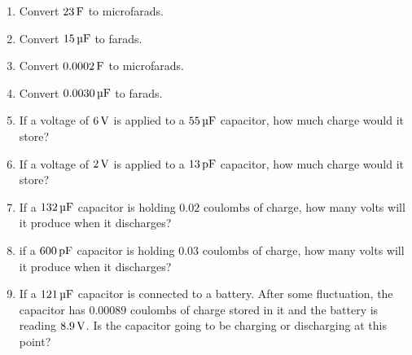 \exercisesection

\begin{enumerate}
\item Convert $23\,\si{\farad}$ to microfarads.
\item Convert $15\,\si{\micro\farad}$ to farads.
\item Convert $0.0002\,\si{\farad}$ to microfarads.
\item Convert $0.0030\,\si{\micro\farad}$ to farads.
\item If a voltage of $6\,\si{\volt}$ is applied to a $55\,\si{\micro\farad}$ capacitor, how much charge would it store?
\item If a voltage of $2\,\si{\volt}$ is applied to a $13\mypf$ capacitor, how much charge would it store?
\item If a $132\,\si{\micro\farad}$ capacitor is holding $0.02\textrm{ coulombs}$ of charge, how many volts will it produce when it discharges?
\item if a $600\mypf$ capacitor is holding $0.03\textrm{ coulombs}$ of charge, how many volts will it produce when it discharges?
\item If a $121\,\si{\micro\farad}$ capacitor is connected to a battery.  After some fluctuation, the capacitor has $0.00089\textrm{ coulombs}$ of charge stored in it and the battery is reading $8.9\,\si{\volt}$.  Is the capacitor going to be charging or discharging at this point?
\end{enumerate}
